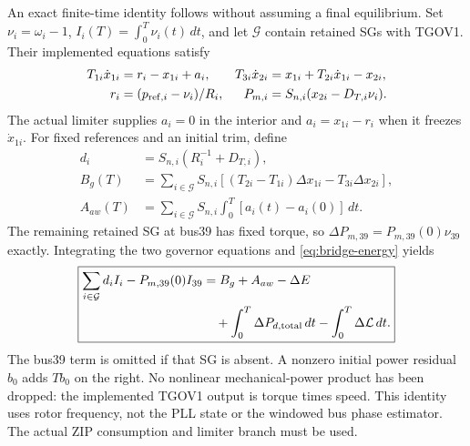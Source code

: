 An exact finite-time identity follows without assuming a final equilibrium.
Set $\nu_i=\omega_i-1$, $I_i(T)=\int_0^T\nu_i(t)\,dt$, and let $\mathcal G$
contain retained SGs with TGOV1. Their implemented equations satisfy
\begin{align}
 T_{1i}\dot x_{1i}&=r_i-x_{1i}+a_i,&
 T_{3i}\dot x_{2i}&=x_{1i}+T_{2i}\dot x_{1i}-x_{2i},\nonumber\\
 r_i&=(p_{{\rm ref},i}-\nu_i)/R_i,&
 P_{m,i}&=S_{n,i}(x_{2i}-D_{T,i}\nu_i).
\end{align}
The actual limiter supplies $a_i=0$ in the interior and
$a_i=x_{1i}-r_i$ when it freezes $\dot x_{1i}$. For fixed references and
an initial trim, define
\begin{align}
 d_i&=S_{n,i}(R_i^{-1}+D_{T,i}),\nonumber\\
 B_g(T)&=\sum_{i\in\mathcal G}S_{n,i}
 [(T_{2i}-T_{1i})\Delta x_{1i}-T_{3i}\Delta x_{2i}],\nonumber\\
 A_{aw}(T)&=\sum_{i\in\mathcal G}S_{n,i}
 \int_0^T[a_i(t)-a_i(0)]\,dt.
\end{align}
The remaining retained SG at bus39 has fixed torque, so
$\Delta P_{m,39}=P_{m,39}(0)\nu_{39}$ exactly. Integrating the two governor
equations and \eqref{eq:bridge-energy} yields
\begin{equation}
 \boxed{\begin{aligned}
 \sum_{i\in\mathcal G}d_iI_i-P_{m,39}(0)I_{39}
 &=B_g+A_{aw}-\Delta E\\
 &\quad+\int_0^T\Delta P_{d,\rm total}\,dt
       -\int_0^T\Delta\mathcal L\,dt .
 \end{aligned}}\label{eq:bridge-finite-area}
\end{equation}
The bus39 term is omitted if that SG is absent. A nonzero initial power
residual $b_0$ adds $Tb_0$ on the right. No nonlinear mechanical-power product
has been dropped: the implemented TGOV1 output is torque times speed.
This identity uses rotor frequency, not the PLL state or the windowed bus
phase estimator. The actual ZIP consumption and limiter branch must be used.

